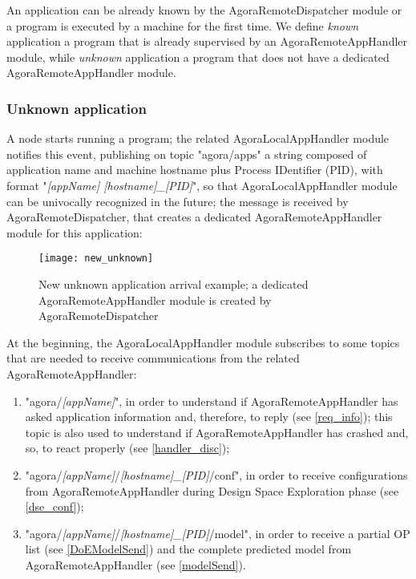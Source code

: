 An application can be already known by the Agora\-Remote\-Dis\-patch\-er module or a program is executed by a machine for the first time. We define \textit{known} application a program that is already supervised by an AgoraRemoteAppHandler module, while \textit{unknown} application a program that does not have a dedicated AgoraRemoteAppHandler module.

\subsubsection{Unknown application}

A node starts running a program; the related AgoraLocalAppHandler module notifies this event, publishing on topic "agora\slash{}apps" a string composed of application name and machine hostname plus Process IDentifier (PID), with format "\textit{[appName] [hostname]\_[PID]}", so that AgoraLocalAppHandler module can be univocally recognized in the future; the message is received by Agora\-Remote\-Dispatcher, that creates a dedicated AgoraRemoteAppHandler module for this application:

\begin{figure}[H]

    \centering
    \texttt{[image: new\_unknown]}
    \caption[New unknown application arrival example]{New unknown application arrival example; a dedicated AgoraRemoteAppHandler module is created by AgoraRemoteDispatcher}
    
\end{figure}

At the beginning, the Agora\-Local\-App\-Handler module subscribes to some topics that are needed to receive communications from the related Agora\-Remote\-App\-Handler:

\begin{enumerate}

    \item "agora/\textit{[appName]}", in order to understand if AgoraRemoteAppHandler has asked application information and, therefore, to reply (see \ref{req_info}); this topic is also used to understand if Agora\-Remote\-App\-Handler has crashed and, so, to react properly (see \ref{handler_disc});
    
    \item "agora/\textit{[appName]}/\textit{[hostname]\_[PID]}/conf", in order to receive configurations from AgoraRemoteAppHandler during Design Space Exploration phase (see \ref{dse_conf});
    
    \item "agora/\textit{[appName]}/\textit{[hostname]\_[PID]}/model", in order to receive a partial OP list (see \ref{DoEModelSend}) and the complete predicted model from AgoraRemoteAppHandler (see \ref{modelSend}).

\end{enumerate}

